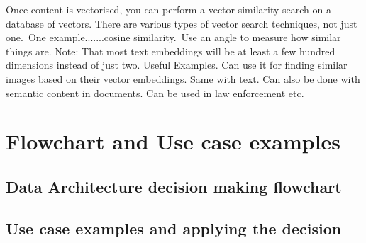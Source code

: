 \documentclass[a4paper, 11pt]{article}
\begin{document}
    Once content is vectorised, you can perform a vector similarity search on a database of vectors.
    There are various types of vector search techniques, not just one.\ One example.......cosine similarity.\ Use an angle to measure how similar things are.
    Note: That most text embeddings will be at least a few hundred dimensions instead of just two.
    Useful Examples.
    Can use it for finding similar images based on their vector embeddings.
    Same with text.
    Can also be done with semantic content in documents.
    Can be used in law enforcement etc.

    \section{Flowchart and Use case examples}

    \subsection{Data Architecture decision making flowchart}

    \subsection{Use case examples and applying the decision}
\end{document}
